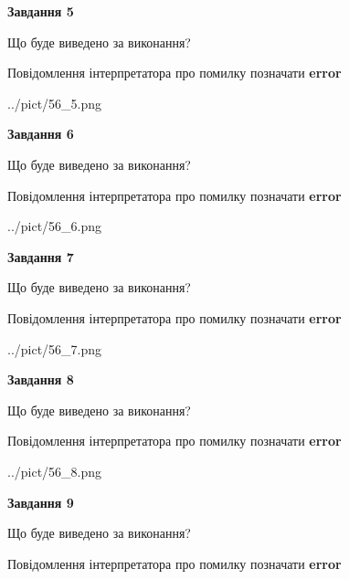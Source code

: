 \documentclass[11pt, ukrainian]{article}
\begin{document}
{\begin {large}
{\begin {center}\textbf{Завдання 5}\end {center}}\par
Що буде виведено за виконання? \par
Повідомлення інтерпретатора про помилку позначати \textbf{error}

\begin{center}
	{../pict/56_5.png}
\end{center}
\newpage

{\begin {center}\textbf{Завдання 6}\end {center}}\par
Що буде виведено за виконання? \par
Повідомлення інтерпретатора про помилку позначати \textbf{error}

\begin{center}
	{../pict/56_6.png}
\end{center}
\newpage

{\begin {center}\textbf{Завдання 7}\end {center}}\par
Що буде виведено за виконання? \par
Повідомлення інтерпретатора про помилку позначати \textbf{error}

\begin{center}
	{../pict/56_7.png}
\end{center}
\newpage

{\begin {center}\textbf{Завдання 8}\end {center}}\par
Що буде виведено за виконання? \par
Повідомлення інтерпретатора про помилку позначати \textbf{error}

\begin{center}
	{../pict/56_8.png}
\end{center}
\newpage

{\begin {center}\textbf{Завдання 9}\end {center}}\par
Що буде виведено за виконання? \par
Повідомлення інтерпретатора про помилку позначати \textbf{error}


\end{large}}
\end{document}
